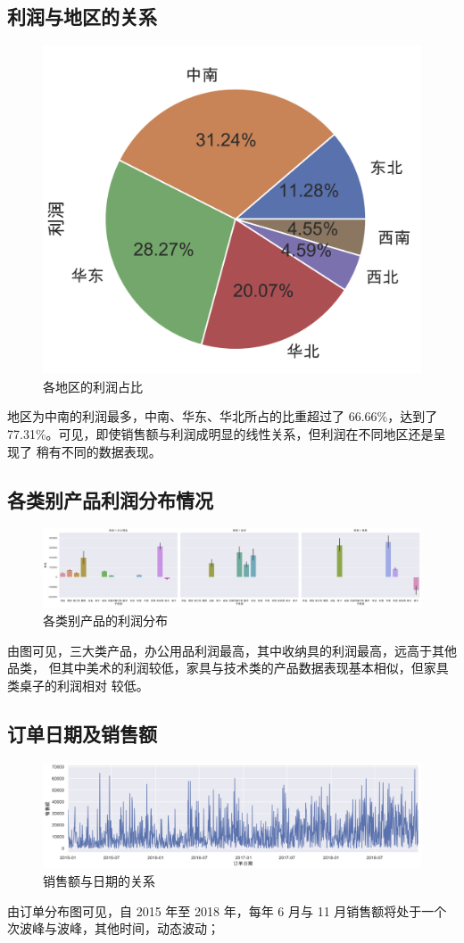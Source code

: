 \documentclass[a4paper]{ctexart}
\begin{document}
\subsection{利润与地区的关系}
\begin{figure}[H]
    \centering
    \includegraphics[width=.5\textwidth]{figures/pie}
    \caption{各地区的利润占比}
\end{figure}
地区为中南的利润最多，中南、华东、华北所占的比重超过了 66.66\%，达到了
77.31\%。可见，即使销售额与利润成明显的线性关系，但利润在不同地区还是呈现了
稍有不同的数据表现。

\subsection{各类别产品利润分布情况}
\begin{figure}[H]
    \centering
    \includegraphics[width=1.2\textwidth]{figures/prod_cat}
    \caption{各类别产品的利润分布}
\end{figure}
由图可见，三大类产品，办公用品利润最高，其中收纳具的利润最高，远高于其他品类，
但其中美术的利润较低，家具与技术类的产品数据表现基本相似，但家具类桌子的利润相对
较低。

\subsection{订单日期及销售额}
\begin{figure}[H]
    \centering
    \includegraphics[width=1.2\textwidth]{figures/time}
    
    \caption{销售额与日期的关系}
\end{figure}
由订单分布图可见，自 2015 年至 2018 年，每年 6 月与 11 月销售额将处于一个
次波峰与波峰，其他时间，动态波动；
\newpage
\end{document}
